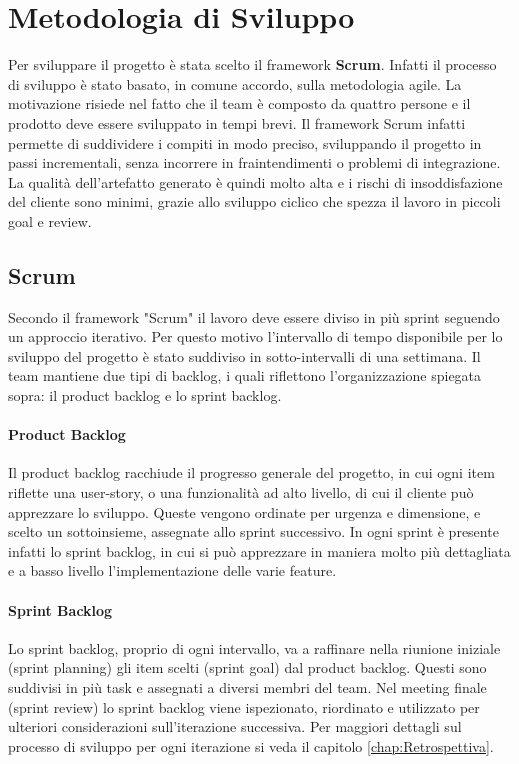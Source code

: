 \section{Metodologia di Sviluppo}
Per sviluppare il progetto è stata scelto il framework \textbf{Scrum}. Infatti il processo di sviluppo è stato basato, in comune accordo, sulla metodologia agile. La motivazione risiede nel fatto che il team è composto da quattro persone e il prodotto deve essere sviluppato in tempi brevi. Il framework Scrum infatti permette di suddividere i compiti in modo preciso, sviluppando il progetto in passi incrementali, senza incorrere in fraintendimenti o problemi di integrazione. La qualità dell'artefatto generato è quindi molto alta e i rischi di insoddisfazione del cliente sono minimi, grazie allo sviluppo ciclico che spezza il lavoro in piccoli goal e review. 
    \subsection{Scrum}
    Secondo il framework "Scrum" il lavoro deve essere diviso in più sprint seguendo un approccio iterativo. Per questo motivo l'intervallo di tempo disponibile per lo sviluppo del progetto è stato suddiviso in sotto-intervalli di una settimana. 
    Il team mantiene due tipi di backlog, i quali riflettono l'organizzazione spiegata sopra: il product backlog e lo sprint backlog. 
    
    \paragraph{Product Backlog}Il product backlog racchiude il progresso generale del progetto, in cui ogni item riflette una user-story, o una funzionalità ad alto livello, di cui il cliente può apprezzare lo sviluppo. Queste vengono ordinate per urgenza e dimensione, e scelto un sottoinsieme, assegnate allo sprint successivo. In ogni sprint è presente infatti lo sprint backlog, in cui si può apprezzare in maniera molto più dettagliata e a basso livello l'implementazione delle varie feature. 

    \paragraph{Sprint Backlog} Lo sprint backlog, proprio di ogni intervallo, va a raffinare nella riunione iniziale (sprint planning) gli item scelti (sprint goal) dal product backlog. Questi sono suddivisi in più task e assegnati a diversi membri del team. Nel meeting finale (sprint review) lo sprint backlog viene ispezionato, riordinato e utilizzato per ulteriori considerazioni sull'iterazione successiva. Per maggiori dettagli sul processo di sviluppo per ogni iterazione si veda il capitolo \ref{chap:Retrospettiva}.

